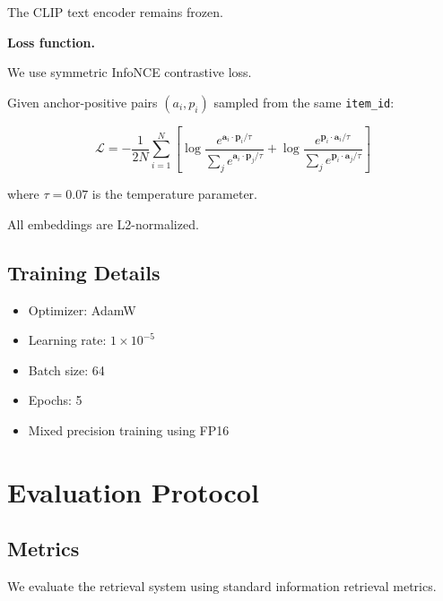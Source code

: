 \documentclass[12pt,a4paper]{article}
\begin{document}
The CLIP text encoder remains frozen.

\textbf{Loss function.}

We use symmetric InfoNCE contrastive loss.

Given anchor-positive pairs $(a_i,p_i)$ sampled from the same
\texttt{item\_id}:

\begin{equation}
\mathcal{L}
=
-\frac{1}{2N}
\sum_{i=1}^{N}
\left[
\log
\frac{
e^{\mathbf{a}_i \cdot \mathbf{p}_i / \tau}
}{
\sum_j e^{\mathbf{a}_i \cdot \mathbf{p}_j / \tau}
}
+
\log
\frac{
e^{\mathbf{p}_i \cdot \mathbf{a}_i / \tau}
}{
\sum_j e^{\mathbf{p}_i \cdot \mathbf{a}_j / \tau}
}
\right]
\end{equation}

where $\tau = 0.07$ is the temperature parameter.

All embeddings are L2-normalized.

\subsection{Training Details}

\begin{itemize}[noitemsep]
    \item Optimizer: AdamW
    \item Learning rate: $1 \times 10^{-5}$
    \item Batch size: 64
    \item Epochs: 5
    \item Mixed precision training using FP16
\end{itemize}

\section{Evaluation Protocol}

\subsection{Metrics}

We evaluate the retrieval system using standard information retrieval metrics.
\end{document}
